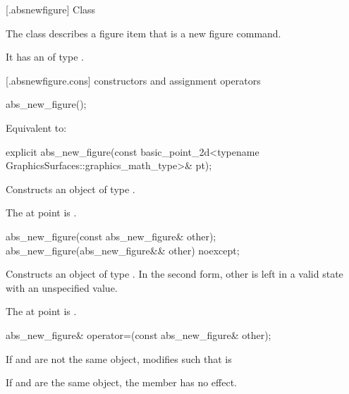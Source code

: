  [\iotwod.absnewfigure] {Class }

\pnum
{}%
The class  describes a figure item that is a new figure command.

\pnum
It has an  of type .

 [\iotwod.absnewfigure.cons] { constructors and assignment operators}%

%
\begin{itemdecl}
abs_new_figure();
\end{itemdecl}
\begin{itemdescr}
\pnum
\effects
Equivalent to: 
\end{itemdescr}

%
\begin{itemdecl}
explicit abs_new_figure(const basic_point_2d<typename
  GraphicsSurfaces::graphics_math_type>& pt);
\end{itemdecl}
\begin{itemdescr}
\pnum
\effects
Constructs an object of type .

\pnum
The at point is .
\end{itemdescr}

%
\begin{itemdecl}
abs_new_figure(const abs_new_figure& other);
abs_new_figure(abs_new_figure&& other) noexcept;
\end{itemdecl}
\begin{itemdescr}
\pnum
\effects
Constructs an object of type . In the second form, other is left in a valid state with an unspecified value.
	
\pnum
The at point is .
\end{itemdescr}

%
\begin{itemdecl}
abs_new_figure& operator=(const abs_new_figure& other);
\end{itemdecl}
\begin{itemdescr}
\pnum
\effects
If  and  are not the same object, modifies  such that  is 

\pnum
If  and  are the same object, the member has no effect.
	
\pnum
\returns
{}
\end{itemdescr}

